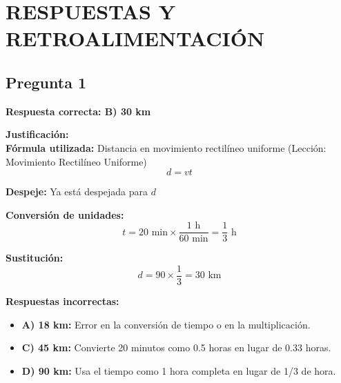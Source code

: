 \newpage
\onecolumn
\section{RESPUESTAS Y RETROALIMENTACIÓN}

\begin{respuestabox}
\subsection{Pregunta 1}
\textcolor{verdecorrecto}{\textbf{Respuesta correcta: B) 30 km}}

\textbf{Justificación:}\\
\textbf{Fórmula utilizada:} Distancia en movimiento rectilíneo uniforme (Lección: Movimiento Rectilíneo Uniforme)
$$d = vt$$

\textbf{Despeje:} Ya está despejada para $d$

\textbf{Conversión de unidades:}
$$t = 20 \text{ min} \times \frac{1 \text{ h}}{60 \text{ min}} = \frac{1}{3} \text{ h}$$

\textbf{Sustitución:}
$$d = 90 \times \frac{1}{3} = 30 \text{ km}$$

\textbf{Respuestas incorrectas:}
\begin{itemize}
    \item \textbf{A) 18 km:} Error en la conversión de tiempo o en la multiplicación.
    \item \textbf{C) 45 km:} Convierte 20 minutos como 0.5 horas en lugar de 0.33 horas.
    \item \textbf{D) 90 km:} Usa el tiempo como 1 hora completa en lugar de 1/3 de hora.
\end{itemize}
\end{respuestabox}

